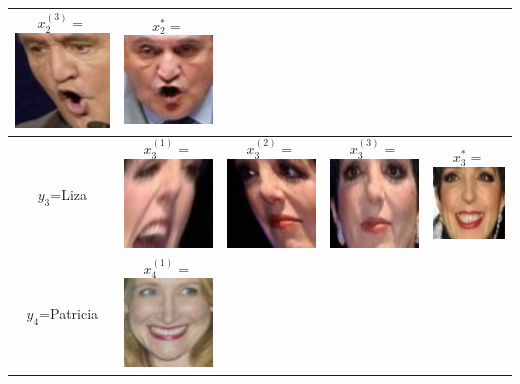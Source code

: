 \documentclass{beamer}
\begin{document}
\begin{frame}
\begin{center}
\begin{tabular}{|c|ccc|c|}
  $x_2^{(3)} = $\includegraphics[scale = 0.2]{face_photos/Jean-Pierre_Raffarin_0003.png} &  
  $x_2^{*} = $\includegraphics[scale = 0.2]{face_photos/Jean-Pierre_Raffarin_0004.png} \\ \hline
$y_3$=Liza & 
  $x_3^{(1)} = $\includegraphics[scale = 0.2]{face_photos/Liza_Minnelli_0001.png} &  
  $x_3^{(2)} = $\includegraphics[scale = 0.2]{face_photos/Liza_Minnelli_0002.png} &  
  $x_3^{(3)} = $\includegraphics[scale = 0.2]{face_photos/Liza_Minnelli_0003.png} &  
  $x_3^{*} = $\includegraphics[scale = 0.2]{face_photos/Liza_Minnelli_0004.png} \\ \hline
$y_4$=Patricia & 
  $x_4^{(1)} = $\includegraphics[scale = 0.2]{face_photos/Patricia_Clarkson_0001.png} &  

\end{tabular}
\end{center}
\end{frame}
\end{document}
